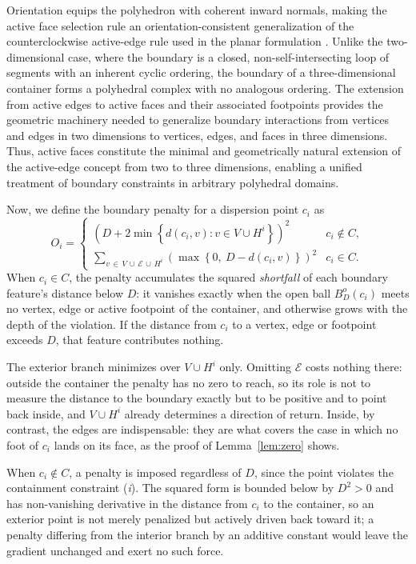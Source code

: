 \documentclass[preprint,12pt]{elsarticle}
\theoremstyle{remark}
\newcommand{\set}[1]{\left\{ #1 \right\}}
\newcommand{\paren}[1]{\left( #1 \right)}
\begin{document}
Orientation equips the polyhedron with coherent inward normals, making the
active face selection rule an orientation-consistent generalization of the
counterclockwise active-edge rule used in the planar formulation
\citep{lai2024}. Unlike the two-dimensional case, where the boundary is a
closed, non-self-intersecting loop of segments with an inherent cyclic ordering,
the boundary of a three-dimensional container forms a polyhedral complex with no
analogous ordering. The extension from active edges \citep{lai2024} to active
faces and their associated footpoints provides the geometric machinery needed to
generalize boundary interactions from vertices and edges in two dimensions to
vertices, edges, and faces in three dimensions. Thus, active faces constitute
the minimal and geometrically natural extension of the active-edge concept from
two to three dimensions, enabling a unified treatment of boundary constraints in
arbitrary polyhedral domains.

Now, we define the boundary penalty for a dispersion point $c_i$ as
\begin{equation}
  O_i =
  \begin{cases}
    \paren{D + 2 \min \set{d(c_i, v) : v \in V \cup H^i}}^2 & c_i
    \notin C, \\[4pt]
    \displaystyle\sum_{v \, \in \, V \, \cup \, \mathcal{E} \, \cup \, H^i}
    \paren{\max \set{0,\ D - d(c_i, v)}}^2 & c_i \in C.
  \end{cases}
  \label{eq:O_i}
\end{equation}
When $c_i \in C$, the penalty accumulates the squared \emph{shortfall} of each
boundary feature's distance below $D$: it vanishes exactly when the open ball
$B^o_D(c_i)$ meets no vertex, edge or active footpoint of the container, and
otherwise grows with the depth of the violation. If the distance from $c_i$ to a
vertex, edge or footpoint exceeds $D$, that feature contributes nothing.

The exterior branch minimizes over $V \cup H^i$ only. Omitting $\mathcal{E}$
costs nothing there: outside the container the penalty has no zero to reach, so
its role is not to measure the distance to the boundary exactly but to be
positive and to point back inside, and $V \cup H^i$ already determines a
direction of return. Inside, by contrast, the edges are indispensable: they are
what covers the case in which no foot of $c_i$ lands on its face, as the proof
of Lemma~\ref{lem:zero} shows.

When $c_i \notin C$, a penalty is imposed regardless of $D$, since the point
violates the containment constraint (\textit{i}). The squared form is bounded
below by $D^2 > 0$ and has non-vanishing derivative in the distance from $c_i$
to the container, so an exterior point is not merely penalized but actively
driven back toward it; a penalty differing from the interior branch by an
additive constant would leave the gradient unchanged and exert no such force.
\end{document}
